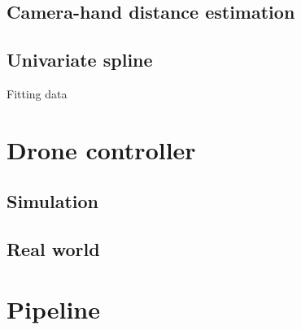 \subsection{Camera-hand distance estimation}
\label{subsec:cam-hand}

\subsection{Univariate spline}
\label{sec:univspline}
Fitting data

\section{Drone controller}
\label{sec:dronecontrl}

\subsection{Simulation}
\label{sec:simulation}

\subsection{Real world}
\label{sec:simulation}

\section{Pipeline}
\label{sec:pipeline}
